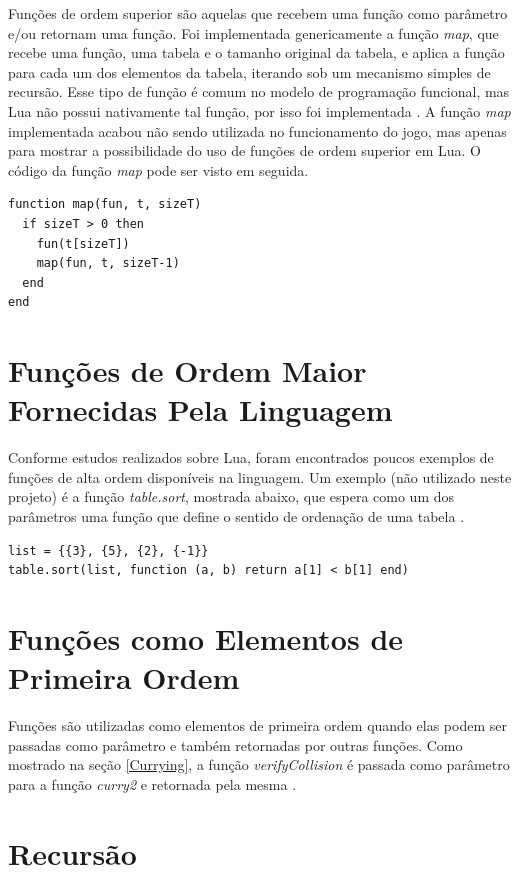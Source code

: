 \documentclass[rel_mlp]{iiufrgs}
\begin{document}
Funções de ordem superior são aquelas que recebem uma função como parâmetro e/ou retornam uma função. Foi implementada genericamente a função \textit{map}, que recebe uma função, uma tabela e o tamanho original da tabela, e aplica a função para cada um dos elementos da tabela, iterando sob um mecanismo simples de recursão. Esse tipo de função é comum no modelo de programação funcional, mas Lua não possui nativamente tal função, por isso foi implementada \cite{HigherOrderFunctionLua}. A função \textit{map} implementada acabou não sendo utilizada no funcionamento do jogo, mas apenas para mostrar a possibilidade do uso de funções de ordem superior em Lua. O código da função \textit{map} pode ser visto em seguida.

\begin{lstlisting}
function map(fun, t, sizeT)
  if sizeT > 0 then
    fun(t[sizeT])
    map(fun, t, sizeT-1)
  end
end
\end{lstlisting}

\section{Funções de Ordem Maior Fornecidas Pela Linguagem}

Conforme estudos realizados sobre Lua, foram encontrados poucos exemplos de funções de alta ordem disponíveis na linguagem. Um exemplo (não utilizado neste projeto) é a função \textit{table.sort}, mostrada abaixo, que espera como um dos parâmetros uma função que define o sentido de ordenação de uma tabela \cite{FunctionsLua}.

\begin{lstlisting}
list = {{3}, {5}, {2}, {-1}}
table.sort(list, function (a, b) return a[1] < b[1] end)
\end{lstlisting}

\section{Funções como Elementos de Primeira Ordem}

Funções são utilizadas como elementos de primeira ordem quando elas podem ser passadas como parâmetro e também retornadas por outras funções. Como mostrado na seção \ref{Currying}, a função \textit{verifyCollision} é passada como parâmetro para a função \textit{curry2} e retornada pela mesma \cite{FunctionsLua}.

\section{Recursão}
\end{document}
